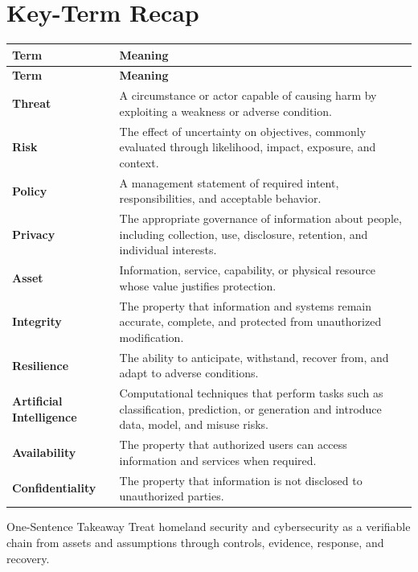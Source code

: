\documentclass[11pt,letterpaper]{article}
\begin{document}
\section*{Key-Term Recap}
\begin{longtable}{>{\RaggedRight\arraybackslash}p{}>{\RaggedRight\arraybackslash}p{}}
\toprule\rowcolor{Navy}\color{white}\textbf{Term} & \color{white}\textbf{Meaning}\\\midrule
\endfirsthead
\toprule\rowcolor{Navy}\color{white}\textbf{Term} & \color{white}\textbf{Meaning}\\\midrule
\endhead
\textbf{Threat} & A circumstance or actor capable of causing harm by exploiting a weakness or adverse condition. \\\midrule
\textbf{Risk} & The effect of uncertainty on objectives, commonly evaluated through likelihood, impact, exposure, and context. \\\midrule
\textbf{Policy} & A management statement of required intent, responsibilities, and acceptable behavior. \\\midrule
\textbf{Privacy} & The appropriate governance of information about people, including collection, use, disclosure, retention, and individual interests. \\\midrule
\textbf{Asset} & Information, service, capability, or physical resource whose value justifies protection. \\\midrule
\textbf{Integrity} & The property that information and systems remain accurate, complete, and protected from unauthorized modification. \\\midrule
\textbf{Resilience} & The ability to anticipate, withstand, recover from, and adapt to adverse conditions. \\\midrule
\textbf{Artificial Intelligence} & Computational techniques that perform tasks such as classification, prediction, or generation and introduce data, model, and misuse risks. \\\midrule
\textbf{Availability} & The property that authorized users can access information and services when required. \\\midrule
\textbf{Confidentiality} & The property that information is not disclosed to unauthorized parties. \\\midrule
\bottomrule
\end{longtable}
\begin{CornellExamBox}{One-Sentence Takeaway}
Treat homeland security and cybersecurity as a verifiable chain from assets and assumptions through controls, evidence, response, and recovery.
\end{CornellExamBox}
\end{document}
